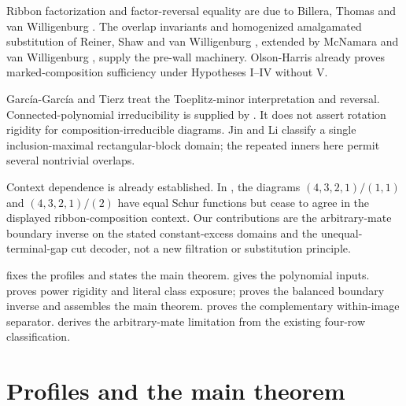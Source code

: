 \documentclass[11pt,a4paper]{amsart}
\numberwithin{equation}{section}
\theoremstyle{plain}
\theoremstyle{definition}
\begin{document}
Ribbon factorization and factor-reversal equality are due to Billera,
Thomas and van Willigenburg \cite{Billera2006DecomposableCompositions}.
The overlap invariants and homogenized amalgamated substitution of
Reiner, Shaw and van Willigenburg \cite{Reiner2007Coincidences},
extended by McNamara and van Willigenburg
\cite{McNamara2009Classification}, supply the pre-wall machinery.
Olson-Harris \cite{OlsonHarris2024HopfApplications} already proves
marked-composition sufficiency under Hypotheses I--IV without V.

Garc\'ia-Garc\'ia and Tierz \cite{GarciaGarcia2020ToeplitzMinors}
treat the Toeplitz-minor interpretation and reversal.
Connected-polynomial irreducibility is supplied by
\cite{Barekat2009CoincidencesCorrigendum}.  It does not assert rotation
rigidity for composition-irreducible diagrams.  Jin and Li
\cite{Jin2024ThickenedRibbon} classify a single inclusion-maximal
rectangular-block domain; the repeated inners here permit several
nontrivial overlaps.

Context dependence is already established.  In
\cite[Example~7.8]{Reiner2007Coincidences}, the diagrams
\((4,3,2,1)/(1,1)\) and \((4,3,2,1)/(2)\) have equal Schur
functions but cease to agree in the displayed ribbon-composition context.  Our contributions are the
arbitrary-mate boundary inverse on the stated constant-excess domains and
the unequal-terminal-gap cut decoder, not a new filtration or substitution
principle.

 fixes the profiles and states the main theorem.
 gives the polynomial inputs.
 proves power rigidity and literal class exposure;
 proves the balanced boundary inverse and
assembles the main theorem.
 proves the complementary within-image
separator.   derives the arbitrary-mate limitation
from the existing four-row classification.

\section{Profiles and the main theorem}\label{sec:main}
\end{document}
